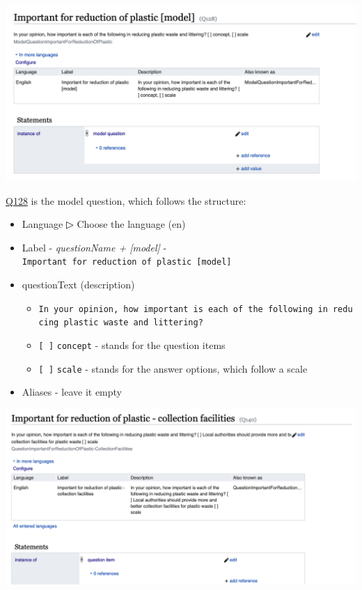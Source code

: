 \documentclass[
  letterpaper,
  DIV=11,
  numbers=noendperiod]{scrreprt}
\begin{document}
\begin{center}
\includegraphics{png/question_to_wikibase/matrixQuestion_modelQuestion_2x1.png}
\end{center}

\href{https://reprexbase.eu/demowiki/index.php?title=Item:Q128}{Q128} is
the model question, which follows the structure:

\begin{itemize}
\item
  Language ▷ Choose the language (en)
\item
  Label - \emph{questionName + {[}model{]}} -
  \texttt{Important\ for\ reduction\ of\ plastic\ {[}model{]}}
\item
  questionText (description)

  \begin{itemize}
  \item
    \texttt{In\ your\ opinion,\ how\ important\ is\ each\ of\ the\ following\ in\ reducing\ plastic\ waste\ and\ littering?}
  \item
    \texttt{{[}\ {]}} \texttt{concept} - stands for the question items
  \item
    \texttt{{[}\ {]}} \texttt{scale} - stands for the answer options,
    which follow a scale
  \end{itemize}
\item
  Aliases - leave it empty
\end{itemize}

\begin{center}
\includegraphics{png/question_to_wikibase/matrixQuestion_questionItem_2x1.png}
\end{center}
\end{document}
